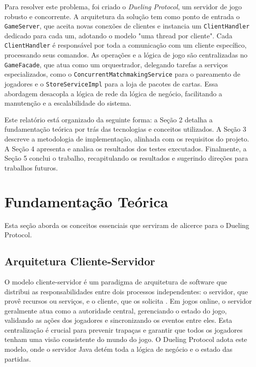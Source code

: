 \documentclass[12pt,a4paper]{article}
\begin{document}
Para resolver este problema, foi criado o \textit{Dueling Protocol}, um servidor de jogo robusto e concorrente. A arquitetura da solução tem como ponto de entrada o \texttt{GameServer}, que aceita novas conexões de clientes e instancia um \texttt{ClientHandler} dedicado para cada um, adotando o modelo "uma thread por cliente". Cada \texttt{ClientHandler} é responsável por toda a comunicação com um cliente específico, processando seus comandos. As operações e a lógica de jogo são centralizadas no \texttt{GameFacade}, que atua como um orquestrador, delegando tarefas a serviços especializados, como o \texttt{ConcurrentMatchmakingService} para o pareamento de jogadores e o \texttt{StoreServiceImpl} para a loja de pacotes de cartas. Essa abordagem desacopla a lógica de rede da lógica de negócio, facilitando a manutenção e a escalabilidade do sistema.

Este relatório está organizado da seguinte forma: a Seção 2 detalha a fundamentação teórica por trás das tecnologias e conceitos utilizados. A Seção 3 descreve a metodologia de implementação, alinhada com os requisitos do projeto. A Seção 4 apresenta e analisa os resultados dos testes executados. Finalmente, a Seção 5 conclui o trabalho, recapitulando os resultados e sugerindo direções para trabalhos futuros.

\section{Fundamentação Teórica}

Esta seção aborda os conceitos essenciais que serviram de alicerce para o Dueling Protocol.

\subsection{Arquitetura Cliente-Servidor}
O modelo cliente-servidor é um paradigma de arquitetura de software que distribui as responsabilidades entre dois processos independentes: o servidor, que provê recursos ou serviços, e o cliente, que os solicita \cite{tanenbaum}. Em jogos online, o servidor geralmente atua como a autoridade central, gerenciando o estado do jogo, validando as ações dos jogadores e sincronizando os eventos entre eles. Esta centralização é crucial para prevenir trapaças e garantir que todos os jogadores tenham uma visão consistente do mundo do jogo. O Dueling Protocol adota este modelo, onde o servidor Java detém toda a lógica de negócio e o estado das partidas.
\end{document}
